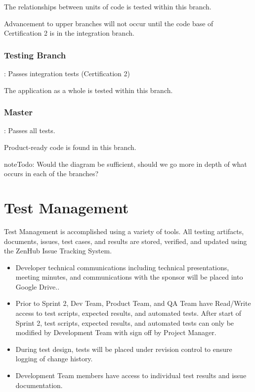\documentclass[letterpaper,10pt,english]{sphinxmanual}
\begin{document}
The relationships between units of code is tested within this branch.

Advancement to upper branches will not occur until the code base of Certification 2 is in the integration branch.


\subsection{Testing Branch}
\label{\detokenize{test_plan/repository_management:testing-branch}}
: Passes integration tests (Certification 2)

The application as a whole is tested within this branch.


\subsection{Master}
\label{\detokenize{test_plan/repository_management:master}}
: Passes all tests.

Product-ready code is found in this branch.

\begin{sphinxadmonition}{note}{\label{test_plan/repository_management:index-0}Todo:}
Would the diagram be sufficient, should we go more in depth of what occurs in each of the branches?
\end{sphinxadmonition}


\chapter{Test Management}
\label{\detokenize{test_plan/test_management:test-management}}\label{\detokenize{test_plan/test_management::doc}}
Test Management is accomplished using a variety of tools. All testing artifacts, documents, issues, test cases, and results are stored, verified, and updated using the ZenHub Issue Tracking System.
\begin{itemize}
\item {} 
Developer technical communications including technical presentations, meeting minutes, and communications with the sponsor will be placed into Google Drive..

\item {} 
Prior to Sprint 2, Dev Team, Product Team, and QA Team have Read/Write access to test scripts, expected results, and automated tests.  After start of Sprint 2, test scripts, expected results, and automated tests can only be modified by Development Team with sign off by Project Manager.

\item {} 
During test design, tests will be placed under revision control to ensure logging of change history.

\item {} 
Development Team members have access to individual test results and issue documentation.

\end{itemize}
\end{document}
